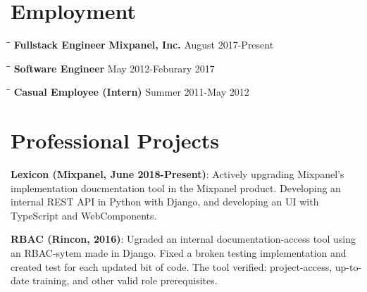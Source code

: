 \documentclass{res}
\begin{document}
 
\thispagestyle{empty} %
\address{ksiondag846@gmail.com\\
(520) 329-5081\\
\url{https://github.com/ksiondag}\\
Seattle, WA}


\begin{resume}
   
\section{Employment} 
\vspace{-0.1in} 
  \begin{tabbing}
    \hspace{2.2in}\= \hspace{2.2in}\= \kill
    {\bf Fullstack Engineer} \> {\bf Mixpanel, Inc.}     \>August 2017-Present
  \end{tabbing}\vspace{-5pt}

  \vspace{-20pt}\begin{tabbing}
    \hspace{2.2in}\= \hspace{2.2in}\= \kill
    {\bf Software Engineer}  \> May 2012-Feburary 2017
  \end{tabbing}\vspace{-5pt}
  \vspace{-20pt}\begin{tabbing}
    \hspace{2.2in}\= \hspace{2.2in}\= \kill
    {\bf Casual Employee (Intern)}  \> Summer 2011-May 2012
  \end{tabbing}\vspace{-5pt}

\section{Professional Projects}
  {\bf Lexicon (Mixpanel, June 2018-Present)}: Actively upgrading Mixpanel's implementation doucmentation tool
  in the Mixpanel product. Developing an internal REST API in Python with Django, and developing an UI with
  TypeScript and WebComponents.

  {\bf RBAC (Rincon, 2016)}: Ugraded an internal documentation-access tool using an RBAC-sytem made in Django.
  Fixed a broken testing implementation and created test for each updated bit of code. The tool
  verified: project-access, up-to-date training, and other valid role prerequisites. 


\end{resume}
\end{document}
